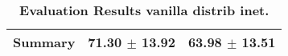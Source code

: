 \begin{table}[htb]
{\begin{tabular}{lll}
\midrule
\textbf{Summary                                  } &                  \phantom{0}71.30 $\pm$ 13.92 &                      \phantom{0}63.98 $\pm$ 13.51 \\
\bottomrule
\end{tabular}%
}
\caption{\textbf{Evaluation Results vanilla distrib inet.}}
\label{tab:eval-results}
\end{table}
